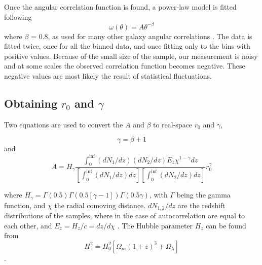 Once the angular correlation function is found, a power-law model is fitted following 
\begin{equation}
    \omega(\theta) = A\theta^{-\beta} 
\end{equation} where $\beta$ = 0.8, as used for many other galaxy angular correlations \cite{hickox2011clustering}. The data is fitted twice, once for all the binned data, and once fitting only to the bins with positive values. Because of the small size of the sample, our measurement is noisy and at some scales the observed correlation function becomes negative. These negative values are most likely the result of statistical fluctuations. 

\subsection{Obtaining $r_0$ and $\gamma$}

Two equations are used to convert the $A$ and $\beta$ to real-space $r_0$ and $\gamma$, 

\begin{equation}
    \gamma = \beta + 1
\end{equation} and \begin{equation}
    A = H_{\gamma}\frac{\int_{0}^{\inf} (dN_1/dz)(dN_2/dz)E_z\chi^{1 - \gamma} dz}{[\int_{0}^{\inf} (dN_1/dz)dz][\int_{0}^{\inf} (dN_2/dz)dz]}r_0^{\gamma}
\end{equation}

where $H_{\gamma} = \Gamma(0.5)\Gamma(0.5[\gamma -1])\Gamma(0.5\gamma)$, with $\Gamma$ being the gamma function, and $\chi$ the radial comoving distance. $dN_{1,2}/dz$ are the redshift distributions of the samples, where in the case of autocorrelation are equal to each other, and $E_z = H_z/c = dz/d\chi$ \cite{hickox2011clustering}. The Hubble parameter $H_z$ can be found from
\begin{equation}
    H_z^2 = H_0^2[\Omega_m(1+z)^3 + \Omega_{\lambda}]
\end{equation}\cite{hickox2011clustering}.

